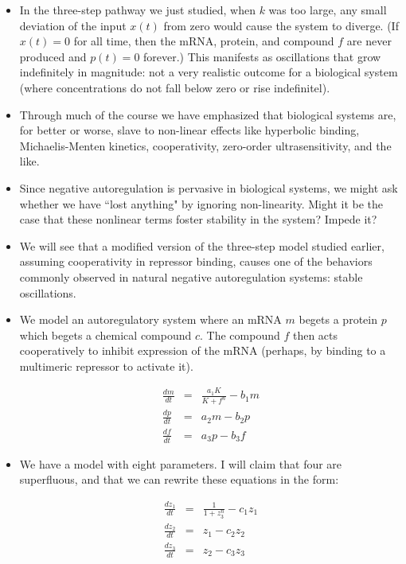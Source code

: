 \documentclass{article}
\begin{document}
\begin{itemize}
\item In the three-step pathway we just studied, when $k$ was too large, any small deviation of the input $x(t)$ from zero would cause the system to diverge. (If $x(t)=0$ for all time, then the mRNA, protein, and compound $f$ are never produced and $p(t)=0$ forever.) This manifests as oscillations that grow indefinitely in magnitude: not a very realistic outcome for a biological system (where concentrations do not fall below zero or rise indefinitel).

\item Through much of the course we have emphasized that biological systems are, for better or worse, slave to non-linear effects like hyperbolic binding, Michaelis-Menten kinetics, cooperativity, zero-order ultrasensitivity, and the like.

\item Since negative autoregulation is pervasive in biological systems, we might ask whether we have ``lost anything" by ignoring non-linearity. Might it be the case that these nonlinear terms foster stability in the system? Impede it?

\item We will see that a modified version of the three-step model studied earlier, assuming cooperativity in repressor binding, causes one of the behaviors commonly observed in natural negative autoregulation systems: stable oscillations.

\item We model an autoregulatory system where an mRNA $m$ begets a protein $p$ which begets a chemical compound $c$. The compound $f$ then acts cooperatively to inhibit expression of the mRNA (perhaps, by binding to a multimeric repressor to activate it).

\begin{eqnarray*}
\frac{dm}{dt}& = &\frac{a_1 K}{K + f^n} - b_1 m\\
\frac{dp}{dt} &= &a_2 m - b_2p\\
\frac{df}{dt} &= &a_3 p - b_3f
\end{eqnarray*}

\item We have a model with eight parameters. I will claim that four are superfluous, and that we can rewrite these equations in the form:

\begin{eqnarray*}
\frac{dz_1}{dt} &= &\frac{1}{1 + z_3^n} - c_1 z_1\\
\frac{dz_2}{dt} &= &z_1 - c_2 z_2\\
\frac{dz_3}{dt} &= &z_2 -c_3 z_3
\end{eqnarray*}


\end{itemize}
\end{document}
